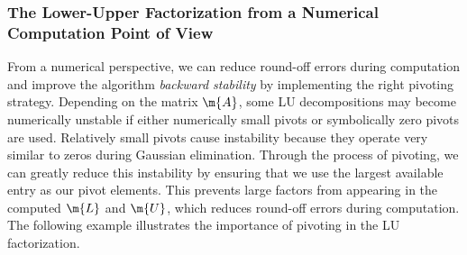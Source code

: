 \subsubsection{The Lower-Upper Factorization from a Numerical Computation Point of View}

From a numerical perspective, we can reduce round-off errors during computation and improve the algorithm \emph{backward stability} by implementing the right pivoting strategy. Depending on the matrix $\m{A}$, some \ac{LU} decompositions may become numerically unstable if either numerically small pivots or symbolically zero pivots are used. Relatively small pivots cause instability because they operate very similar to zeros during Gaussian elimination. Through the process of pivoting, we can greatly reduce this instability by ensuring that we use the largest available entry as our pivot elements. This prevents large factors from appearing in the computed $\m{L}$ and $\m{U}$, which reduces round-off errors during computation. The following example illustrates the importance of pivoting in the \ac{LU} factorization.

